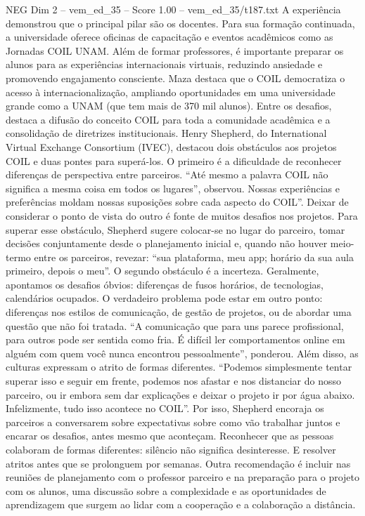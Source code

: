 \begin{textsample}{NEG Dim 2 – vem\_ed\_35 – Score 1.00 – vem\_ed\_35/t187.txt}
A experiência demonstrou que o principal pilar são os docentes.
Para sua formação continuada, a universidade oferece oficinas de capacitação e eventos acadêmicos como as Jornadas COIL UNAM.
Além de formar professores, é importante preparar os alunos para as experiências internacionais virtuais, reduzindo ansiedade e promovendo engajamento consciente.
Maza destaca que o COIL democratiza o acesso à internacionalização, ampliando oportunidades em uma universidade grande como a UNAM (que tem mais de 370 mil alunos).
Entre os desafios, destaca a difusão do conceito COIL para toda a comunidade acadêmica e a consolidação de diretrizes institucionais.
Henry Shepherd, do International Virtual Exchange Consortium (IVEC), destacou dois obstáculos aos projetos COIL e duas pontes para superá-los.
O primeiro é a dificuldade de reconhecer diferenças de perspectiva entre parceiros. “Até mesmo a palavra COIL não significa a mesma coisa em todos os lugares”, observou.
Nossas experiências e preferências moldam nossas suposições sobre cada aspecto do COIL”.
Deixar de considerar o ponto de vista do outro é fonte de muitos desafios nos projetos.
Para superar esse obstáculo, Shepherd sugere colocar-se no lugar do parceiro, tomar decisões conjuntamente desde o planejamento inicial e, quando não houver meio-termo entre os parceiros, revezar: “sua plataforma, meu app; horário da sua aula primeiro, depois o meu”.
O segundo obstáculo é a incerteza.
Geralmente, apontamos os desafios óbvios: diferenças de fusos horários, de tecnologias, calendários ocupados.
O verdadeiro problema pode estar em outro ponto: diferenças nos estilos de comunicação, de gestão de projetos, ou de abordar uma questão que não foi tratada. “A comunicação que para uns parece profissional, para outros pode ser sentida como fria.
É difícil ler comportamentos online em alguém com quem você nunca encontrou pessoalmente”, ponderou.
Além disso, as culturas expressam o atrito de formas diferentes. “Podemos simplesmente tentar superar isso e seguir em frente, podemos nos afastar e nos distanciar do nosso parceiro, ou ir embora sem dar explicações e deixar o projeto ir por água abaixo.
Infelizmente, tudo isso acontece no COIL”.
Por isso, Shepherd encoraja os parceiros a conversarem sobre expectativas sobre como vão trabalhar juntos e encarar os desafios, antes mesmo que aconteçam.
Reconhecer que as pessoas colaboram de formas diferentes: silêncio não significa desinteresse.
E resolver atritos antes que se prolonguem por semanas.
Outra recomendação é incluir nas reuniões de planejamento com o professor parceiro e na preparação para o projeto com os alunos, uma discussão sobre a complexidade e as oportunidades de aprendizagem que surgem ao lidar com a cooperação e a colaboração a distância.

\end{textsample}
